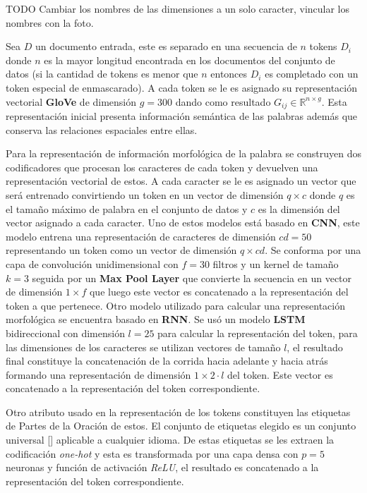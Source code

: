 TODO Cambiar los nombres de las dimensiones a un solo caracter, vincular los nombres con la foto.

Sea $D$ un documento entrada, este es separado en una secuencia de $n$ tokens $D_i$ donde $n$ es la mayor longitud encontrada
en los documentos del conjunto de datos (si la cantidad de tokens es menor que $n$ entonces $D_i$ es completado con un token especial de enmascarado). 
A cada token se le es asignado
su representación vectorial \textbf{GloVe} de dimensión $g=300$ dando como resultado $G_{ij} \in \mathbb{R}^{n \times g}$.
Esta representación inicial presenta información semántica de las palabras además que conserva las relaciones 
espaciales entre ellas. 

Para la representación de información morfológica de la palabra se construyen dos
codificadores que procesan los caracteres de cada token y devuelven una representación vectorial de estos.
A cada caracter se le es asignado un vector que será entrenado convirtiendo un token en un vector de dimensión
$q \times c$ donde $q$ es el tamaño máximo de palabra en el conjunto de datos y $c$ es la dimensión del vector
asignado a cada caracter.
Uno de estos modelos está basado en \textbf{CNN}, este modelo entrena una representación de caracteres de dimensión
$cd=50$ representando un token como un vector de dimensión $q \times cd$. Se conforma por una capa de convolución unidimensional
con $f=30$ filtros y un kernel de tamaño $k=3$ seguida por un \textbf{Max Pool Layer} que convierte la secuencia en un vector
de dimensión $1 \times f$ que luego este vector es concatenado a la representación del token a que pertenece.
Otro modelo utilizado para calcular una representación morfológica se encuentra basado en \textbf{RNN}. Se usó
un modelo \textbf{LSTM} bidireccional con dimensión $l=25$ para calcular la representación del token, para las dimensiones de los caracteres se
utilizan vectores de tamaño $l$, el resultado final constituye la concatenación de la corrida hacia adelante y
hacia atrás formando una representación de dimensión $1 \times 2·l$ del token. Este vector es concatenado a la representación
del token correspondiente.

Otro atributo usado en la representación de los tokens constituyen las etiquetas de Partes de la Oración de estos.
El conjunto de etiquetas elegido es un conjunto universal [\cite{petrov2011universal}] aplicable a cualquier idioma.
De estas etiquetas se les extraen la codificación \emph{one-hot} y esta es transformada por una capa densa con $p=5$ neuronas
y función de activación \emph{ReLU}, el resultado es concatenado a la representación del token correspondiente.

